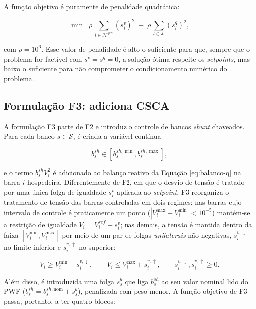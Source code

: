 A função objetivo é puramente de penalidade quadrática:

\begin{equation}
\label{eq:obj-16}
\min \;\; \rho \, \sum_{i \in \mathcal{N}^{gen}} (s^v_i)^2 \;+\; \rho \, \sum_{l \in \mathcal{L}} (s^q_l)^2,
\end{equation}

\noindent com $\rho = 10^6$. Esse valor de penalidade é alto o suficiente para que, sempre que o problema for factível com $s^v = s^q = 0$, a solução ótima respeite os \textit{setpoints}, mas baixo o suficiente para não comprometer o condicionamento numérico do problema.

\subsection{Formulação F3: adiciona CSCA}
\label{subsec:f17}

A formulação F3 parte de F2 e introduz o controle de bancos \textit{shunt} chaveados. Para cada banco $s \in \mathcal{S}$, é criada a variável contínua

\begin{equation}
\label{eq:csca-var}
b^{sh}_s \in [b^{sh,\min}_s, b^{sh,\max}_s],
\end{equation}

\noindent e o termo $b^{sh}_s V_i^2$ é adicionado ao balanço reativo da Equação \eqref{eq:balanco-q} na barra $i$ hospedeira. Diferentemente de F2, em que o desvio de tensão é tratado por uma única folga de igualdade $s^v_i$ aplicada ao \textit{setpoint}, F3 reorganiza o tratamento de tensão das barras controladas em dois regimes: nas barras cujo intervalo de controle é praticamente um ponto ($|V^{\max}_i - V^{\min}_i| < 10^{-5}$) mantém-se a restrição de igualdade $V_i = V^{ref}_i + s^v_i$; nas demais, a tensão é mantida dentro da faixa $[V^{\min}_i, V^{\max}_i]$ por meio de um par de folgas \emph{unilaterais} não negativas, $s^{v,\downarrow}_i$ no limite inferior e $s^{v,\uparrow}_i$ no superior:

\begin{equation}
\label{eq:csca-slack-v}
V_i \ge V^{\min}_i - s^{v,\downarrow}_i, \qquad V_i \le V^{\max}_i + s^{v,\uparrow}_i, \qquad s^{v,\downarrow}_i, s^{v,\uparrow}_i \ge 0.
\end{equation}

\noindent Além disso, é introduzida uma folga $s^b_s$ que liga $b^{sh}_s$ ao seu valor nominal lido do PWF ($b^{sh}_s = b^{sh,\text{nom}}_s + s^b_s$), penalizada com peso menor. A função objetivo de F3 passa, portanto, a ter quatro blocos:

